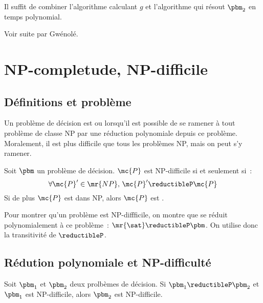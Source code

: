 \begin{demonstration}
    Il suffit de combiner l'algorithme calculant $g$ et l'algorithme qui résout $\pbm_2$ en temps polynomial.
\end{demonstration}

Voir suite par Gwénolé.

\section{NP-completude, NP-difficile}

\subsection{Définitions et problème \sat}

\begin{definition}{}{}
    Un problème de décision est  ou  lorsqu'il est possible de se ramener à tout problème de classe NP par une réduction polynomiale depuis ce problème.\\
    Moralement, il est plus difficile que tous les problèmes NP, mais on peut s'y ramener.
\end{definition}

\begin{definition}{}{}
    Soit $\pbm$ un problème de décision. $\mc{P}$ est NP-difficile si et seulement si~:
    $$\forall \mc{P}' \in \mr{NP},\, \mc{P}' \reductibleP \mc{P}$$
    Si de plus $\mc{P}$ est dans NP, alors $\mc{P}$ est .
\end{definition}

\begin{remarque}{}{}
    Pour montrer qu'un problème est NP-diffficile, on montre que \sat se réduit polynomialement à ce problème~: $\mr{\sat} \reductibleP \pbm$.
    On utilise donc la transitivité de $\reductibleP$.
\end{remarque}

\subsection{Rédution polynomiale et NP-difficulté}


\begin{proposition}{}{}
    Soit $\pbm_1$ et $\pbm_2$ deux prolbèmes de décision. Si $\pbm_1 \reductibleP \pbm_2$ et $\pbm_1$ est NP-difficile, alors $\pbm_2$ est NP-difficile.
\end{proposition}

